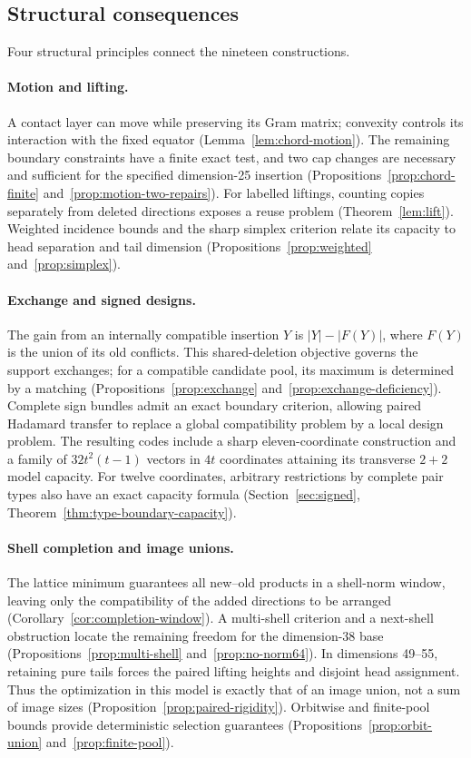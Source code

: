 \subsection{Structural consequences}

Four structural principles connect the nineteen constructions.

\paragraph{Motion and lifting.}
A contact layer can move while preserving its Gram matrix; convexity
controls its interaction with the fixed equator
(Lemma~\ref{lem:chord-motion}). The remaining boundary constraints have
a finite exact test, and two cap changes are necessary and sufficient
for the specified dimension-25 insertion
(Propositions~\ref{prop:chord-finite} and~\ref{prop:motion-two-repairs}).
For labelled liftings, counting copies separately from deleted directions
exposes a reuse problem (Theorem~\ref{lem:lift}). Weighted incidence
bounds and the sharp simplex criterion relate its capacity to head
separation and tail dimension (Propositions~\ref{prop:weighted}
and~\ref{prop:simplex}).

\paragraph{Exchange and signed designs.}
The gain from an internally compatible insertion $Y$ is
$|Y|-|F(Y)|$, where $F(Y)$ is the union of its old conflicts.
This shared-deletion objective governs the support exchanges; for a
compatible candidate pool, its maximum is determined by a matching
(Propositions~\ref{prop:exchange} and~\ref{prop:exchange-deficiency}).
Complete sign bundles admit an exact boundary criterion, allowing
paired Hadamard transfer to replace a global compatibility problem by
a local design problem. The resulting codes include a sharp
eleven-coordinate construction and a family of $32t^2(t-1)$ vectors
in $4t$ coordinates attaining its transverse $2+2$ model capacity.
For twelve coordinates, arbitrary restrictions by complete pair types
also have an exact capacity formula
(Section~\ref{sec:signed}, Theorem~\ref{thm:type-boundary-capacity}).

\paragraph{Shell completion and image unions.}
The lattice minimum guarantees all new--old products in a shell-norm
window, leaving only the compatibility of the added directions to
be arranged (Corollary~\ref{cor:completion-window}). A multi-shell
criterion and a next-shell obstruction locate the remaining freedom
for the dimension-38 base (Propositions~\ref{prop:multi-shell}
and~\ref{prop:no-norm64}). In dimensions 49--55, retaining pure tails
forces the paired lifting heights and disjoint head assignment.
Thus the optimization in this model is exactly that of an image union,
not a sum of image sizes (Proposition~\ref{prop:paired-rigidity}).
Orbitwise and finite-pool bounds provide deterministic selection
guarantees (Propositions~\ref{prop:orbit-union} and~\ref{prop:finite-pool}).

